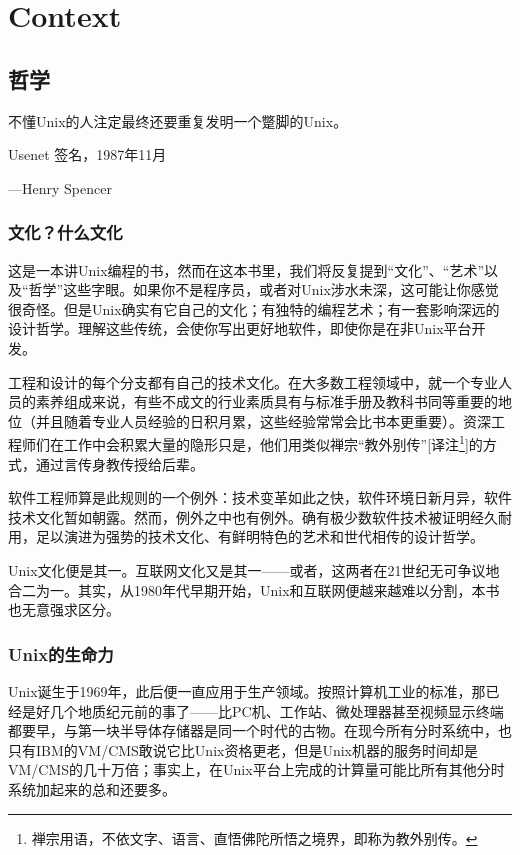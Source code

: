 \documentclass[12pt,oneside]{book}
\begin{document}
\mainmatter 

\part{Context}
\chapter{哲学}

\begin{flushright}
不懂Unix的人注定最终还要重复发明一个蹩脚的Unix。

{\hfill Usenet 签名，1987年11月}

{\hfill —Henry Spencer}
\end{flushright}


\section{文化？什么文化}
这是一本讲Unix编程的书，然而在这本书里，我们将反复提到“文化”、“艺术”以及“哲学”这些字眼。如果你不是程序员，或者对Unix涉水未深，这可能让你感觉很奇怪。但是Unix确实有它自己的文化；有独特的编程艺术；有一套影响深远的设计哲学。理解这些传统，会使你写出更好地软件，即使你是在非Unix平台开发。

工程和设计的每个分支都有自己的技术文化。在大多数工程领域中，就一个专业人员的素养组成来说，有些不成文的行业素质具有与标准手册及教科书同等重要的地位（并且随着专业人员经验的日积月累，这些经验常常会比书本更重要）。资深工程师们在工作中会积累大量的隐形只是，他们用类似禅宗“教外别传”[译注\footnote{禅宗用语，不依文字、语言、直悟佛陀所悟之境界，即称为教外别传。}]的方式，通过言传身教传授给后辈。

软件工程师算是此规则的一个例外：技术变革如此之快，软件环境日新月异，软件技术文化暂如朝露。然而，例外之中也有例外。确有极少数软件技术被证明经久耐用，足以演进为强势的技术文化、有鲜明特色的艺术和世代相传的设计哲学。

Unix文化便是其一。互联网文化又是其一——或者，这两者在21世纪无可争议地合二为一。其实，从1980年代早期开始，Unix和互联网便越来越难以分割，本书也无意强求区分。


\section{Unix的生命力}
Unix诞生于1969年，此后便一直应用于生产领域。按照计算机工业的标准，那已经是好几个地质纪元前的事了——比PC机、工作站、微处理器甚至视频显示终端都要早，与第一块半导体存储器是同一个时代的古物。在现今所有分时系统中，也只有IBM的VM/CMS敢说它比Unix资格更老，但是Unix机器的服务时间却是VM/CMS的几十万倍；事实上，在Unix平台上完成的计算量可能比所有其他分时系统加起来的总和还要多。
\end{document}
